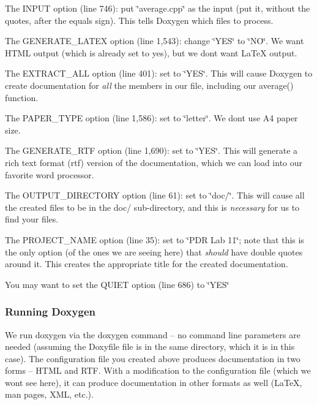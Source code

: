 \begin{DoxyItemize}
\item The {\ttfamily I\+N\+P\+UT} option (line 746)\+: put \char`\"{}average.\+cpp\char`\"{} as the input (put it, without the quotes, after the equals sign). This tells Doxygen which files to process.
\item The {\ttfamily G\+E\+N\+E\+R\+A\+T\+E\+\_\+\+L\+A\+T\+EX} option (line 1,543)\+: change \char`\"{}\+Y\+E\+S\char`\"{} to \char`\"{}\+N\+O\char`\"{}. We want H\+T\+ML output (which is already set to yes), but we don\textquotesingle{}t want La\+TeX output.
\item The {\ttfamily E\+X\+T\+R\+A\+C\+T\+\_\+\+A\+LL} option (line 401)\+: set to \char`\"{}\+Y\+E\+S\char`\"{}. This will cause Doxygen to create documentation for {\itshape all} the members in our file, including our {\ttfamily average()} function.
\item The {\ttfamily P\+A\+P\+E\+R\+\_\+\+T\+Y\+PE} option (line 1,586)\+: set to \char`\"{}letter\char`\"{}. We don\textquotesingle{}t use A4 paper size.
\item The {\ttfamily G\+E\+N\+E\+R\+A\+T\+E\+\_\+\+R\+TF} option (line 1,690)\+: set to \char`\"{}\+Y\+E\+S\char`\"{}. This will generate a rich text format (rtf) version of the documentation, which we can load into our favorite word processor.
\item The {\ttfamily O\+U\+T\+P\+U\+T\+\_\+\+D\+I\+R\+E\+C\+T\+O\+RY} option (line 61)\+: set to \char`\"{}doc/\char`\"{}. This will cause all the created files to be in the doc/ sub-\/directory, and this is {\itshape necessary} for us to find your files.
\item The {\ttfamily P\+R\+O\+J\+E\+C\+T\+\_\+\+N\+A\+ME} option (line 35)\+: set to \char`\"{}\+P\+D\+R Lab 11\char`\"{}; note that this is the only option (of the ones we are seeing here) that {\itshape should} have double quotes around it. This creates the appropriate title for the created documentation.
\item You may want to set the {\ttfamily Q\+U\+I\+ET} option (line 686) to \char`\"{}\+Y\+E\+S\char`\"{}
\end{DoxyItemize}

\subsubsection*{Running Doxygen}

We run doxygen via the {\ttfamily doxygen} command -- no command line parameters are needed (assuming the {\ttfamily Doxyfile} file is in the same directory, which it is in this case). The configuration file you created above produces documentation in two forms -- H\+T\+ML and R\+TF. With a modification to the configuration file (which we won\textquotesingle{}t see here), it can produce documentation in other formats as well (La\+TeX, man pages, X\+ML, etc.).


